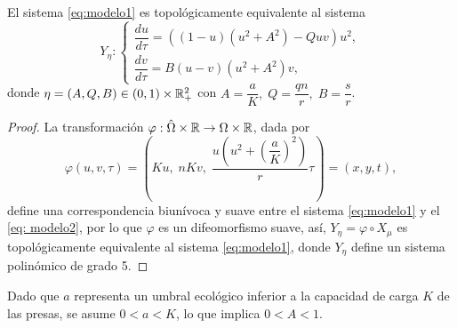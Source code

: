 \begin{pro}
	El sistema \eqref{eq:modelo1} es topológicamente equivalente al sistema
	\begin{equation}
		Y_{\eta}:
		\begin{cases}
			\dfrac{du}{d \tau} = \left((1 - u)(u^{2} + A^{2}) - Q u v\right)u^{2}, \\[5pt]
			\dfrac{dv}{d \tau} = B(u - v)(u^{2} + A^{2})v,
		\end{cases}
		\label{eq: modelo2}
	\end{equation}
	donde $\eta = (A, Q, B) \in (0, 1) \times {\mathbb{R}}^{2}_{+}$ con $A = \dfrac{a}{K}, \; Q = \dfrac{qn}{r}, \; B = \dfrac{s}{r}$.
\end{pro}

\begin{proof}
	La transformación $\varphi : \hat{\Omega} \times {\mathbb{R}} \rightarrow \Omega \times {\mathbb{R}}$, dada por
	\begin{equation*}
		\varphi(u, v, \tau) = \left( Ku, \; nKv, \; \dfrac{u\left(u^{2}+\left(\dfrac{a}{K}\right)^{2}\right)}{r} \tau \right) = (x, y, t),
	\end{equation*} define una correspondencia biunívoca y suave entre el sistema \eqref{eq:modelo1} y el \eqref{eq: modelo2}, por lo que $\varphi$ es un difeomorfismo suave, así, $Y_{\eta} = \varphi \circ X_{\mu}$ es topológicamente equivalente al sistema \eqref{eq:modelo1}, donde $Y_{\eta}$ define un sistema polinómico de grado 5.
\end{proof}

\begin{remark}
	Dado que $a$ representa un umbral ecológico inferior a la capacidad de carga $K$ de las presas, se asume $0 < a < K$, lo que implica $0 < A < 1$.
\end{remark}

